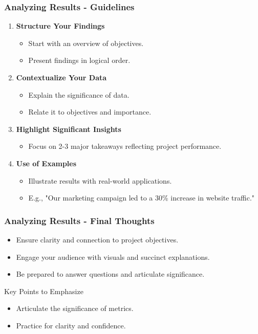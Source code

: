 \documentclass{beamer}
\begin{document}
\begin{frame}[fragile]
    \frametitle{Analyzing Results - Guidelines}
    \begin{enumerate}
        \item \textbf{Structure Your Findings}
        \begin{itemize}
            \item Start with an overview of objectives. 
            \item Present findings in logical order.
        \end{itemize}

        \item \textbf{Contextualize Your Data}
        \begin{itemize}
            \item Explain the significance of data.
            \item Relate it to objectives and importance.
        \end{itemize}

        \item \textbf{Highlight Significant Insights}
        \begin{itemize}
            \item Focus on 2-3 major takeaways reflecting project performance.
        \end{itemize}

        \item \textbf{Use of Examples}
        \begin{itemize}
            \item Illustrate results with real-world applications.
            \item E.g., "Our marketing campaign led to a 30\% increase in website traffic."
        \end{itemize}
    \end{enumerate}
\end{frame}

\begin{frame}[fragile]
    \frametitle{Analyzing Results - Final Thoughts}
    \begin{itemize}
        \item Ensure clarity and connection to project objectives.
        \item Engage your audience with visuals and succinct explanations.
        \item Be prepared to answer questions and articulate significance.
    \end{itemize}
    \begin{block}{Key Points to Emphasize}
        \begin{itemize}
            \item Articulate the significance of metrics.
            \item Practice for clarity and confidence.
        \end{itemize}
    \end{block}
\end{frame}
\end{document}
